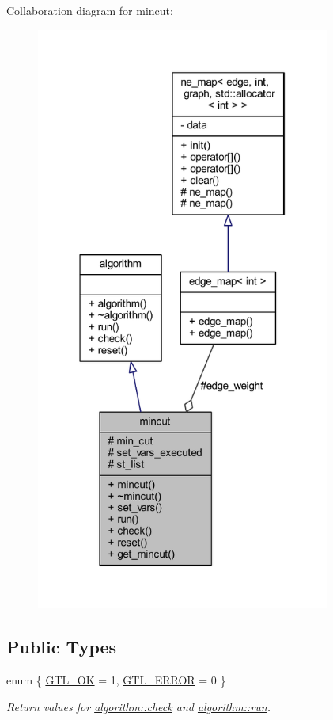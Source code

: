 Collaboration diagram for mincut\+:\nopagebreak
\begin{figure}[H]
\begin{center}
\leavevmode
\includegraphics[width=274pt]{classmincut__coll__graph}
\end{center}
\end{figure}
\subsection*{Public Types}
\begin{DoxyCompactItemize}
\item 
enum \{ \mbox{\hyperlink{classalgorithm_af1a0078e153aa99c24f9bdf0d97f6710a5114c20e4a96a76b5de9f28bf15e282b}{G\+T\+L\+\_\+\+OK}} = 1, 
\mbox{\hyperlink{classalgorithm_af1a0078e153aa99c24f9bdf0d97f6710a6fcf574690bbd6cf710837a169510dd7}{G\+T\+L\+\_\+\+E\+R\+R\+OR}} = 0
 \}
\begin{DoxyCompactList}\small\item\em Return values for \mbox{\hyperlink{classalgorithm_a76361fb03ad1cf643affc51821e43bed}{algorithm\+::check}} and \mbox{\hyperlink{classalgorithm_a734b189509a8d6b56b65f8ff772d43ca}{algorithm\+::run}}. \end{DoxyCompactList}\end{DoxyCompactItemize}

